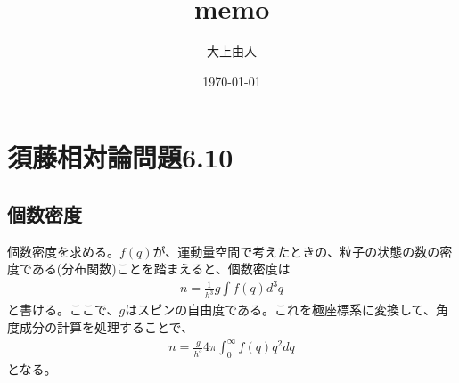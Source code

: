 \documentclass[a4paper,11pt]{jsarticle}
\numberwithin{equation}{section}
\begin{document}
\title{memo}
\author{大上由人}
\date{\today}
\maketitle

\section{須藤相対論問題6.10}
\subsection{個数密度}
個数密度を求める。$f(q)$が、運動量空間で考えたときの、粒子の状態の数の密度である(分布関数)ことを踏まえると、個数密度は
\begin{align}
    n = \frac{1}{h^3}g \int f(q)d^3q
\end{align}
と書ける。ここで、$g$はスピンの自由度である。これを極座標系に変換して、角度成分の計算を処理することで、
\begin{align}
    n = \frac{g}{h^3} 4\pi \int_0^\infty f(q)q^2dq
\end{align}
となる。
\end{document}
